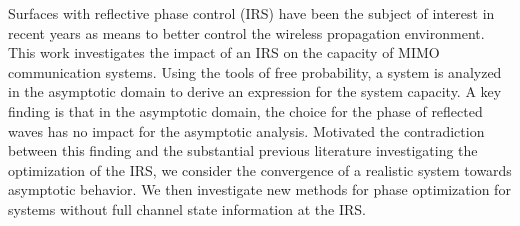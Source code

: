 Surfaces with reflective phase control (IRS) have been the subject of interest in recent years as means to better control the wireless propagation environment. This work investigates the impact of an IRS on the capacity of MIMO communication systems. Using the tools of free probability, a system is analyzed in the asymptotic domain to derive an expression for the system capacity. A key finding is that in the asymptotic domain, the choice for the phase of reflected waves has no impact for the asymptotic analysis. Motivated the contradiction between this finding and the substantial previous literature investigating the optimization of the IRS, we consider the convergence of a realistic system towards asymptotic behavior. We then investigate new methods for phase optimization for systems without full channel state information at the IRS.